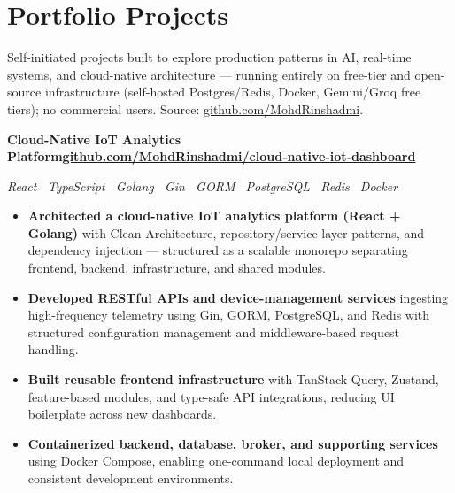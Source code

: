 \documentclass[a4paper,10pt]{article}
\newcommand{\entry}[2]{%
  \noindent\textbf{#1}\hfill\textbf{#2}\par
}
\newcommand{\stack}[1]{%
  {\small\itshape\color{black!72}#1}\par
}
\begin{document}
\newpage
\section{Portfolio Projects}
Self-initiated projects built to explore production patterns in AI, real-time systems, and cloud-native architecture --- running entirely on free-tier and open-source infrastructure (self-hosted Postgres/Redis, Docker, Gemini/Groq free tiers); no commercial users. Source: \href{https://github.com/MohdRinshadmi}{github.com/MohdRinshadmi}.
\vspace{4pt}

\entry{Cloud-Native IoT Analytics Platform}{\normalfont\footnotesize\color{black!72}\href{https://github.com/MohdRinshadmi/cloud-native-iot-dashboard}{github.com/MohdRinshadmi/cloud-native-iot-dashboard}}
\stack{React \textbullet\ TypeScript \textbullet\ Golang \textbullet\ Gin \textbullet\ GORM \textbullet\ PostgreSQL \textbullet\ Redis \textbullet\ Docker}
\begin{itemize}
  \item \textbf{Architected a cloud-native IoT analytics platform (React + Golang)} with Clean Architecture, repository/\allowbreak service-layer patterns, and dependency injection --- structured as a scalable monorepo separating frontend, backend, infrastructure, and shared modules.
  \item \textbf{Developed RESTful APIs and device-management services} ingesting high-frequency telemetry using Gin, GORM, PostgreSQL, and Redis with structured configuration management and middleware-based request handling.
  \item \textbf{Built reusable frontend infrastructure} with TanStack Query, Zustand, feature-based modules, and type-safe API integrations, reducing UI boilerplate across new dashboards.
  \item \textbf{Containerized backend, database, broker, and supporting services} using Docker Compose, enabling one-command local deployment and consistent development environments.
\end{itemize}
\end{document}
